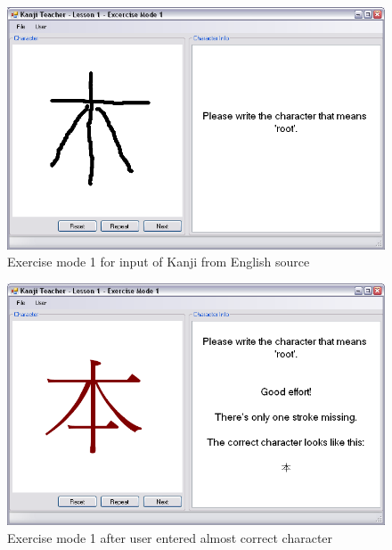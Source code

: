 \begin{figure}[htbp]
\begin{center}
\includegraphics[scale=0.7]{images/ConceptualDesign/exerciseMode1.png}
\caption{Exercise mode 1 for input of Kanji from English source}
\label{fig:exerciseMode1}
\end{center}
\end{figure}

\begin{figure}[htbp]
\begin{center}
\includegraphics[scale=0.7]{images/ConceptualDesign/exerciseMode1Errormessage.png}
\caption{Exercise mode 1 after user entered almost correct character}
\label{fig:exerciseMode1Errormessage}
\end{center}
\end{figure}



